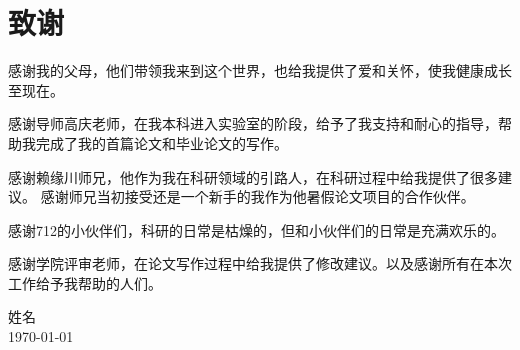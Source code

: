 \chapter{致谢}

    感谢我的父母，他们带领我来到这个世界，也给我提供了爱和关怀，使我健康成长至现在。
	
	感谢导师高庆老师，在我本科进入实验室的阶段，给予了我支持和耐心的指导，帮助我完成了我的首篇论文和毕业论文的写作。
	
	感谢赖缘川师兄，他作为我在科研领域的引路人，在科研过程中给我提供了很多建议。
	感谢师兄当初接受还是一个新手的我作为他暑假论文项目的合作伙伴。
    
	感谢712的小伙伴们，科研的日常是枯燥的，但和小伙伴们的日常是充满欢乐的。
	
	感谢学院评审老师，在论文写作过程中给我提供了修改建议。以及感谢所有在本次工作给予我帮助的人们。


\vskip 108pt
\begin{flushright}
	姓名 \\
	\today
\end{flushright}

